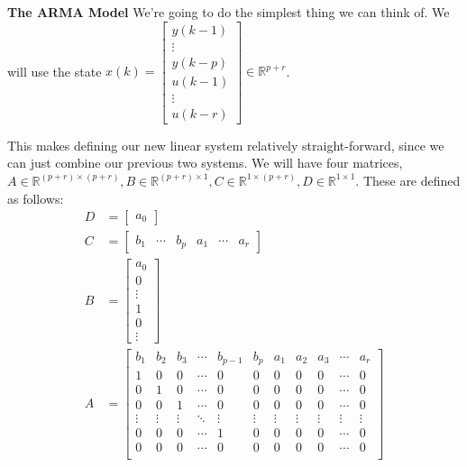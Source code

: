 \documentclass[12pt]{exam}
\begin{document}
\begin{questions}
\begin{solution}
\textbf{The ARMA Model}
We're going to do the simplest thing we can think of. We will use the state $x(k) = 
  \begin{bmatrix}
    y(k-1) \\
    \vdots \\
    y(k-p) \\
    u(k-1) \\
    \vdots \\
    u(k-r)
  \end{bmatrix} \in \mathbb{R}^{p + r}$.

This makes defining our new linear system relatively straight-forward, since we can just combine our previous two systems. We will have four matrices, $A \in \mathbb{R}^{(p+r) \times (p + r)}, B \in \mathbb{R}^{(p+r) \times 1}, C \in \mathbb{R}^{1 \times (p + r)}, D \in \mathbb{R}^{1 \times 1}$. These are defined as follows:
\begin{align*}
  D &=
    \begin{bmatrix}
      a_0
    \end{bmatrix} \\
  C &= 
    \begin{bmatrix}
      b_1 & \cdots & b_p & a_1 & \cdots & a_r
    \end{bmatrix} \\
  B &=
    \begin{bmatrix}
      a_0 \\
      0 \\
      \vdots \\
      1 \\
      0 \\
      \vdots
    \end{bmatrix} \tag{The one is at index $p + 1$} \\
    A &= 
    \begin{bmatrix}
      b_1 & b_2 & b_3 & \cdots & b_{p-1} & b_p & a_1 & a_2 & a_3 & \cdots & a_r \\
      1 & 0 & 0 & \cdots & 0 & 0 & 0 & 0 & 0 & \cdots & 0 \\
      0 & 1 & 0 & \cdots & 0 & 0 & 0 & 0 & 0 & \cdots & 0 \\
      0 & 0 & 1 & \cdots & 0 & 0 & 0 & 0 & 0 & \cdots & 0 \\
      \vdots & \vdots & \vdots & \ddots & \vdots & \vdots & \vdots & \vdots & \vdots & \vdots & \vdots \\
      0 & 0 & 0 & \cdots & 1 & 0 & 0 & 0 & 0 & \cdots & 0 \\
      0 & 0 & 0 & \cdots & 0 & 0 & 0 & 0 & 0 & \cdots & 0 \\

\end{bmatrix}
\end{align*}
\end{solution}
\end{questions}
\end{document}

